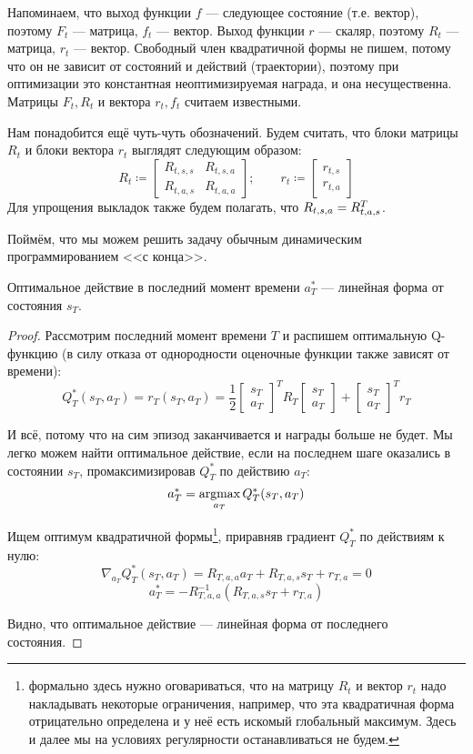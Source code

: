 Напоминаем, что выход функции $f$ --- следующее состояние (т.е. вектор), поэтому $F_t$ --- матрица, $f_t$ --- вектор. Выход функции $r$ --- скаляр, поэтому $R_t$ --- матрица, $r_t$ --- вектор. Свободный член квадратичной формы не пишем, потому что он не зависит от состояний и действий (траектории), поэтому при оптимизации это константная неоптимизируемая награда, и она несущественна. Матрицы $F_t, R_t$ и вектора $r_t, f_t$ считаем известными. 

Нам понадобится ещё чуть-чуть обозначений. Будем считать, что блоки матрицы $R_t$ и блоки вектора $r_t$ выглядят следующим образом:
$$R_t \coloneqq \begin{bmatrix} R_{t, s, s} & R_{t, s, a} \\ R_{t, a, s} & R_{t, a, a} \end{bmatrix}; \qquad r_t \coloneqq \begin{bmatrix} r_{t, s} \\ r_{t, a} \end{bmatrix}$$
Для упрощения выкладок также будем полагать, что $R_{t, s, a} \HM= R^T_{t, a, s}$.

Поймём, что мы можем решить задачу обычным динамическим программированием <<с конца>>.
\begin{theorem}
Оптимальное действие в последний момент времени $a_T^*$ --- линейная форма от состояния $s_T$.
\begin{proof}
Рассмотрим последний момент времени $T$ и распишем оптимальную Q-функцию (в силу отказа от однородности оценочные функции также зависят от времени):
$$Q^*_T(s_T, a_T) = r_T(s_T, a_T) = \frac{1}{2} \begin{bmatrix} s_T \\ a_T \end{bmatrix}^T R_T \begin{bmatrix} s_T \\ a_T \end{bmatrix} + \begin{bmatrix} s_T \\ a_T \end{bmatrix}^T r_T$$

И всё, потому что на сим эпизод заканчивается и награды больше не будет. Мы легко можем найти оптимальное действие, если на последнем шаге оказались в состоянии $s_T$, промаксимизировав $Q^*_T$ по действию $a_T$:
$$a^*_T = \mathop{\mathrm{argmax}}_{a_T} Q^*_T(s_T, a_T)$$

Ищем оптимум квадратичной формы\footnote[*]{формально здесь нужно оговариваться, что на матрицу $R_t$ и вектор $r_t$ надо накладывать некоторые ограничения, например, что эта квадратичная форма отрицательно определена и у неё есть искомый глобальный максимум. Здесь и далее мы на условиях регулярности останавливаться не будем.}, приравняв градиент $Q^*_T$ по действиям к нулю:
$$\nabla_{a_T} Q^*_T(s_T, a_T) = R_{T, a, a} a_T + R_{T, a, s}s_T + r_{T, a} = 0$$
$$a^*_T = -R_{T, a, a}^{-1} \left( R_{T, a, s}s_T + r_{T, a} \right)$$

Видно, что оптимальное действие --- линейная форма от последнего состояния. 
\end{proof}
\end{theorem}

